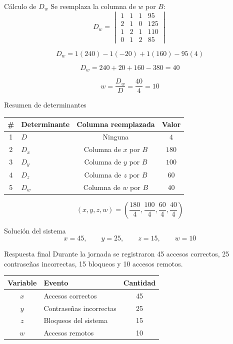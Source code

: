 \documentclass[aspectratio=169]{beamer}
\newcommand{\detm}[1]{\begin{vmatrix}#1\end{vmatrix}}
\begin{document}
\begin{frame}[shrink=8]{Cálculo de $D_w$}
Se reemplaza la columna de $w$ por $B$:
\[
D_w=\detm{
1&1&1&95\\
2&1&0&125\\
1&2&1&110\\
0&1&2&85}
\]

\[
D_w=1(240)-1(-20)+1(160)-95(4)
\]

\[
D_w=240+20+160-380=\boxed{40}
\]

\[
w=\frac{D_w}{D}=\frac{40}{4}=\boxed{10}
\]
\end{frame}

\begin{frame}{Resumen de determinantes}
\begin{table}
\centering
\begin{tabular}{clcc}
\toprule
\# & Determinante & Columna reemplazada & Valor \\
\midrule
1 & $D$ & Ninguna & $4$ \\
2 & $D_x$ & Columna de $x$ por $B$ & $180$ \\
3 & $D_y$ & Columna de $y$ por $B$ & $100$ \\
4 & $D_z$ & Columna de $z$ por $B$ & $60$ \\
5 & $D_w$ & Columna de $w$ por $B$ & $40$ \\
\bottomrule
\end{tabular}
\end{table}

\[
(x,y,z,w)=\left(\frac{180}{4},\frac{100}{4},\frac{60}{4},\frac{40}{4}\right)
\]
\end{frame}

\begin{frame}{Solución del sistema}
\[
x=45,\qquad y=25,\qquad z=15,\qquad w=10
\]

\begin{alertblock}{Respuesta final}
Durante la jornada se registraron 45 accesos correctos, 25 contraseñas incorrectas, 15 bloqueos y 10 accesos remotos.
\end{alertblock}

\begin{table}
\centering
\begin{tabular}{clc}
\toprule
Variable & Evento & Cantidad \\
\midrule
$x$ & Accesos correctos & 45 \\
$y$ & Contraseñas incorrectas & 25 \\
$z$ & Bloqueos del sistema & 15 \\
$w$ & Accesos remotos & 10 \\
\bottomrule
\end{tabular}
\end{table}
\end{frame}
\end{document}
